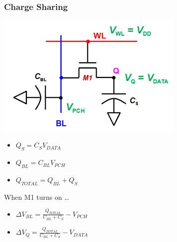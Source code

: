 \documentclass{article}
\begin{document}
\subsubsection{Charge Sharing}
\begin{minipage}[c]{0.5\textwidth}
    \vspace{0pt}
    \includegraphics[width=9cm, scale=1]{dramRead_4.PNG}
\end{minipage}%
\begin{minipage}[c]{0.5\textwidth}
    \begin{itemize}
        \item $Q_{S} = C_{S}V_{DATA}$
        \item $Q_{BL} = C_{BL}V_{PCH}$
        \item $Q_{TOTAL} = Q_{BL} + Q_{S}$
    \end{itemize}

    \vspace{0.5cm}
    When M1 turns on \dots
    \begin{itemize}
        \item $\Delta V_{BL} = \frac{Q_{TOTAL}}{C_{BL} + C_{S}} - V_{PCH}$
        \item $\Delta V_{Q} = \frac{Q_{TOTAL}}{C_{BL} + C_{S}} - V_{DATA}$
    \end{itemize}
\end{minipage}
\end{document}
